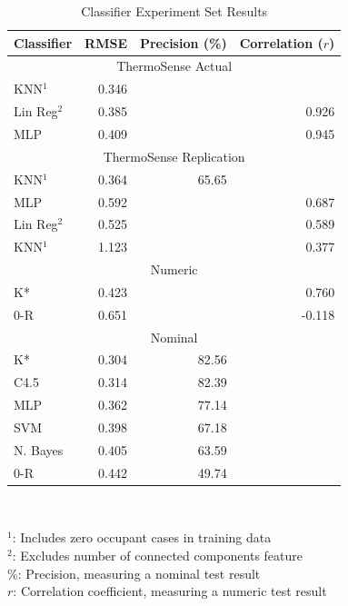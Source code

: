 \documentclass[../thesis/thesis.tex]{subfiles}
\begin{document}
\begin{table}
\centering
\begin{tabular}{|l|r|r|r|}
\hline
\textbf{Classifier} & \textbf{RMSE} & \textbf{Precision (\%)} & \textbf{Correlation ($r$)} \\ \hline
\multicolumn{4}{|c|}{\cellcolor{black!15} ThermoSense Actual}                         \\ \hline
KNN$^1$             & 0.346         &             &              \\ \hline
Lin Reg$^2$         & 0.385         &             & 0.926        \\ \hline
MLP                 & 0.409         &             & 0.945        \\ \hline
\multicolumn{4}{|c|}{\cellcolor{black!15} ThermoSense Replication}                    \\ \hline
KNN$^1$             & 0.364         & 65.65       &              \\ \hline
MLP                 & 0.592         &             & 0.687        \\ \hline
Lin Reg$^2$         & 0.525         &             & 0.589        \\ \hline
KNN$^1$             & 1.123         &             & 0.377        \\ \hline
\multicolumn{4}{|c|}{\cellcolor{black!15} Numeric}                                    \\ \hline
K*                  & 0.423         &             & 0.760        \\ \hline
0-R                 & 0.651         &             & -0.118       \\ \hline
\multicolumn{4}{|c|}{\cellcolor{black!15} Nominal}                                    \\ \hline
K*                  & 0.304         & 82.56       &              \\ \hline
C4.5                & 0.314         & 82.39       &              \\ \hline
MLP                 & 0.362         & 77.14       &              \\ \hline
SVM                 & 0.398         & 67.18       &              \\ \hline
N. Bayes            & 0.405         & 63.59       &              \\ \hline
0-R                 & 0.442         & 49.74       &              \\ \hline
\end{tabular}\\
\parbox{300pt}{
$^1$: Includes zero occupant cases in training data \\
$^2$: Excludes number of connected components feature \\
\%: Precision, measuring a nominal test result \\
$r$: Correlation coefficient, measuring a numeric test result \\
}
\caption{Classifier Experiment Set Results}
\label{tab:results:set1}
\end{table}
\end{document}
